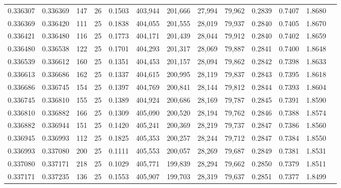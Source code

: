 \begin{tabular}{rrrrrrrrrrrrr}
0.336307 & 0.336369 &   147 &  26 &                                     0.1503 & 403,944 & 201,666 &  27,994 &  79,962 & 0.2839 & 0.7407 & 1.8680 \\
0.336369 & 0.336420 &   111 &  25 &                                     0.1838 & 404,055 & 201,555 &  28,019 &  79,937 & 0.2840 & 0.7405 & 1.8670 \\
0.336421 & 0.336480 &   116 &  25 &                                     0.1773 & 404,171 & 201,439 &  28,044 &  79,912 & 0.2840 & 0.7402 & 1.8659 \\
0.336480 & 0.336538 &   122 &  25 &                                     0.1701 & 404,293 & 201,317 &  28,069 &  79,887 & 0.2841 & 0.7400 & 1.8648 \\
0.336539 & 0.336612 &   160 &  25 &                                     0.1351 & 404,453 & 201,157 &  28,094 &  79,862 & 0.2842 & 0.7398 & 1.8633 \\
0.336613 & 0.336686 &   162 &  25 &                                     0.1337 & 404,615 & 200,995 &  28,119 &  79,837 & 0.2843 & 0.7395 & 1.8618 \\
0.336686 & 0.336745 &   154 &  25 &                                     0.1397 & 404,769 & 200,841 &  28,144 &  79,812 & 0.2844 & 0.7393 & 1.8604 \\
0.336745 & 0.336810 &   155 &  25 &                                     0.1389 & 404,924 & 200,686 &  28,169 &  79,787 & 0.2845 & 0.7391 & 1.8590 \\
0.336810 & 0.336882 &   166 &  25 &                                     0.1309 & 405,090 & 200,520 &  28,194 &  79,762 & 0.2846 & 0.7388 & 1.8574 \\
0.336882 & 0.336944 &   151 &  25 &                                     0.1420 & 405,241 & 200,369 &  28,219 &  79,737 & 0.2847 & 0.7386 & 1.8560 \\
0.336945 & 0.336993 &   112 &  25 &                                     0.1825 & 405,353 & 200,257 &  28,244 &  79,712 & 0.2847 & 0.7384 & 1.8550 \\
0.336993 & 0.337080 &   200 &  25 &                                     0.1111 & 405,553 & 200,057 &  28,269 &  79,687 & 0.2849 & 0.7381 & 1.8531 \\
0.337080 & 0.337171 &   218 &  25 &                                     0.1029 & 405,771 & 199,839 &  28,294 &  79,662 & 0.2850 & 0.7379 & 1.8511 \\
0.337171 & 0.337235 &   136 &  25 &                                     0.1553 & 405,907 & 199,703 &  28,319 &  79,637 & 0.2851 & 0.7377 & 1.8499 \\

\end{tabular}
